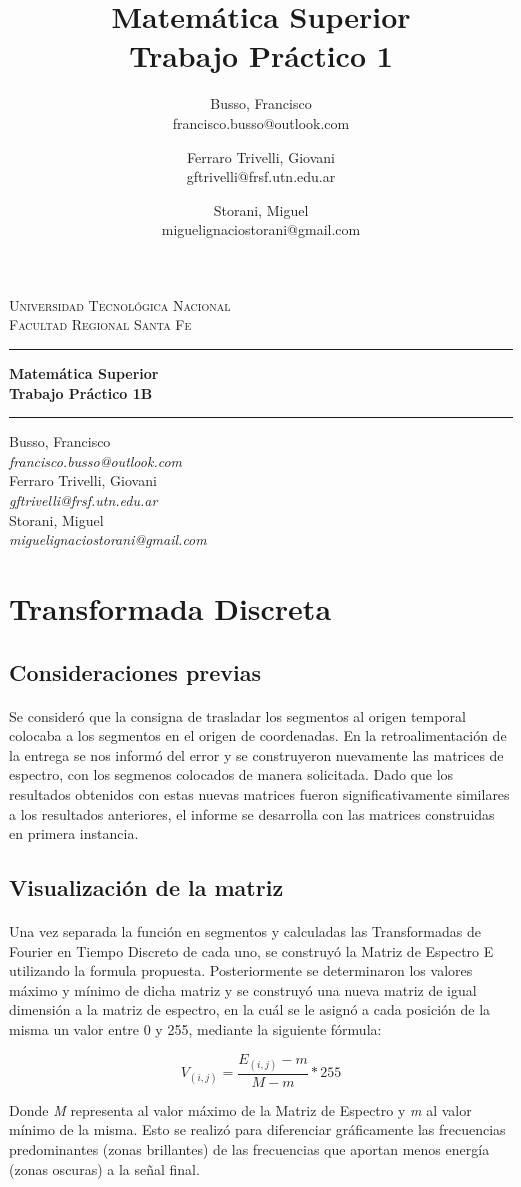 \documentclass{article}
\title{Matemática Superior\\Trabajo Práctico 1}
\author{ Busso, Francisco\\francisco.busso@outlook.com 
    \and Ferraro Trivelli, Giovani\\gftrivelli@frsf.utn.edu.ar
    \and Storani, Miguel\\ miguelignaciostorani@gmail.com
}
\makeatletter
\renewcommand{\maketitle}{
    \begin{center}
        
        {\scshape{Universidad Tecnológica Nacional\\Facultad Regional Santa Fe}}
        \vspace{10pt}
        \hrule
        \vspace{10pt}
       

        {\LARGE\bfseries{Matemática Superior\\}}
        \vspace{5pt}
        {\Huge\bfseries{Trabajo Práctico 1B}}

        \vspace{8pt}
        \hrule
        \vspace{8pt}

        Busso, Francisco\\
        \textit{francisco.busso@outlook.com}\\
        \vspace{7pt}
        Ferraro Trivelli, Giovani\\
        \textit{gftrivelli@frsf.utn.edu.ar}\\
        \vspace{7pt}
        Storani, Miguel\\
        \textit{miguelignaciostorani@gmail.com}\\

        \thispagestyle{empty}
        
        \newpage
    \end{center}
}
\makeatother
\begin{document}
\maketitle
\newpage

\renewcommand{\contentsname}{Índice}
\tableofcontents
\newpage

	\section{Transformada Discreta}
		\subsection{Consideraciones previas}
			\paragraph{}
			Se consideró que la consigna de trasladar los segmentos al origen temporal colocaba a los segmentos en el origen de coordenadas. En la retroalimentación de
			la entrega se nos informó del error y se construyeron nuevamente las matrices de espectro, con los segmenos colocados de manera solicitada. Dado que los resultados
			obtenidos con estas nuevas matrices fueron significativamente similares a los resultados anteriores, el informe se desarrolla con las matrices construidas en primera
			instancia.


		\subsection{Visualización de la matriz}
	        \paragraph{}
	        Una vez separada la función en segmentos y calculadas las Transformadas de Fourier en Tiempo Discreto de cada uno, 
	        se construyó la Matriz de Espectro E utilizando la formula propuesta. Posteriormente se determinaron los valores máximo y mínimo de dicha matriz 
	        y se construyó una nueva matriz de igual dimensión a la matriz de espectro, en la cuál se le asignó a cada posición de la misma un valor entre 0 y 255, 
	        mediante la siguiente fórmula:
	
	        \begin{equation}
	            V_{(i, j)}=\frac{E_{(i, j)}-m}{M-m}*255
	        \end{equation}
	
	        Donde \textit{M} representa al valor máximo de la Matriz de Espectro y \textit{m} al valor mínimo de la misma.
	        Esto se realizó para diferenciar gráficamente las frecuencias predominantes (zonas  brillantes) 
	        de las frecuencias que aportan menos energía (zonas oscuras) a la señal final.
	
\end{document}
